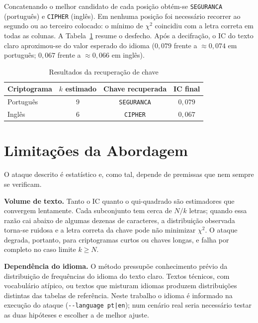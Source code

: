 \documentclass[conference]{IEEEtran}
\begin{document}
Concatenando o melhor candidato de cada posição obtém-se
\texttt{SEGURANCA} (português) e \texttt{CIPHER} (inglês). Em nenhuma
posição foi necessário recorrer ao segundo ou ao terceiro colocado: o mínimo
de $\chi^2$ coincidiu com a letra correta em todas as colunas. A
Tabela~\ref{tab:resultados} resume o desfecho. Após a decifração, o IC do
texto claro aproximou-se do valor esperado do idioma ($0{,}079$ frente a
$\approx 0{,}074$ em português; $0{,}067$ frente a $\approx 0{,}066$ em
inglês).

\begin{table}[htbp]
\caption{Resultados da recuperação de chave}
\label{tab:resultados}
\centering
\footnotesize
\begin{tabular}{@{}lccc@{}}
\toprule
\textbf{Criptograma} & \textbf{$k$ estimado} & \textbf{Chave recuperada} &
\textbf{IC final} \\
\midrule
Português & $9$ & \texttt{SEGURANCA} & $0{,}079$ \\
Inglês    & $6$ & \texttt{CIPHER}    & $0{,}067$ \\
\bottomrule
\end{tabular}
\end{table}

\section{Limitações da Abordagem}
\label{sec:limitacoes}
O ataque descrito é estatístico e, como tal, depende de premissas que nem
sempre se verificam.

\textbf{Volume de texto.} Tanto o IC quanto o qui-quadrado são estimadores
que convergem lentamente. Cada subconjunto tem cerca de $N/k$ letras;
quando essa razão cai abaixo de algumas dezenas de caracteres, a distribuição
observada torna-se ruidosa e a letra correta da chave pode não minimizar
$\chi^2$. O ataque degrada, portanto, para criptogramas curtos ou chaves
longas, e falha por completo no caso limite $k \geq N$.

\textbf{Dependência do idioma.} O método pressupõe conhecimento prévio da
distribuição de frequências do idioma do texto claro. Textos técnicos, com
vocabulário atípico, ou textos que misturam idiomas produzem distribuições
distintas das tabelas de referência. Neste trabalho o idioma é informado na
execução do ataque (\texttt{-{}-language pt|en}); num cenário real seria
necessário testar as duas hipóteses e escolher a de melhor ajuste.
\end{document}
